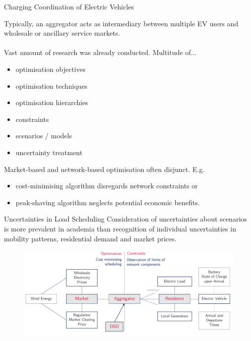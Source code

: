 \documentclass[handout]{beamer}
\begin{document}
\begin{frame}{Charging Coordination of Electric Vehicles}%

	Typically, an \textcolor{UOEred}{aggregator} acts as intermediary between multiple EV users and wholesale or ancillary service markets.\\~\\
\pause
	Vast amount of research was already conducted. Multitude of...
	\begin{multicols}{2}
		\begin{itemize}
			\item optimisation objectives
			\item optimisation techniques
			\item optimisation hierarchies
			\item constraints
			\item scenarios / models
			\item uncertainty treatment
		\end{itemize}
	\end{multicols}
\pause
	Market-based and network-based optimisation often disjunct. E.g.
	\begin{itemize}
		\item cost-minimising algorithm disregards network constraints or
		\item peak-shaving algorithm neglects potential economic benefits.
	\end{itemize}
	
\end{frame}

\begin{frame}{Uncertainties in Load Scheduling}%
	Consideration of \textcolor{UOEred}{uncertainties about scenarios} is more prevalent in academia than recognition of \textcolor{UOEgreen}{individual uncertainties in mobility patterns, residential demand and market prices}.
	\begin{figure}
		\includegraphics[scale = 0.48]{uncertainties.pdf}
	\end{figure}
\end{frame}
\end{document}
